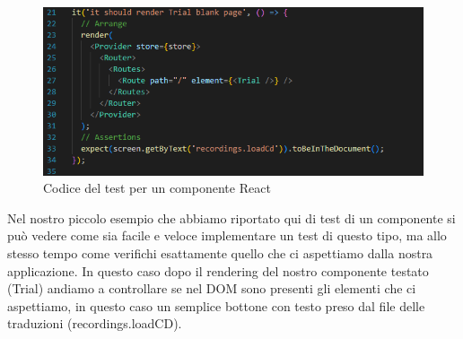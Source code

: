 \begin{figure}[H]
  \centering
  \includegraphics[width=\textwidth]{immagini/test-trial.png}
  \caption{Codice del test per un componente React}
\end{figure}

Nel nostro piccolo esempio che abbiamo riportato qui di test di un componente si può vedere come sia facile e veloce implementare un test di questo tipo, ma allo stesso tempo come
verifichi esattamente quello che ci aspettiamo dalla nostra applicazione. In questo caso dopo il rendering del nostro componente testato (Trial) andiamo a controllare
se nel DOM sono presenti gli elementi che ci aspettiamo, in questo caso un semplice bottone con testo preso dal file delle traduzioni (recordings.loadCD).

